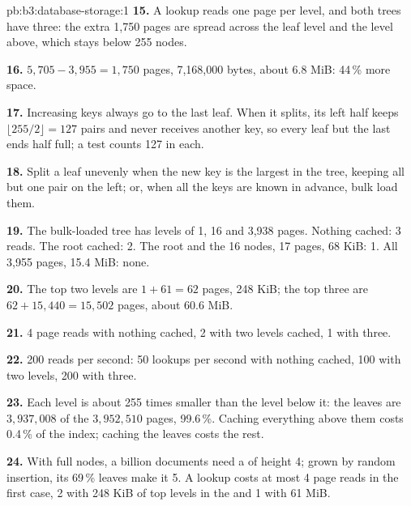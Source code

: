 \begin{solution}{pb:b3:database-storage:1}
\textbf{15.} A lookup reads one page per level, and both trees have three: the extra 1,750 pages are spread across the leaf level and the level above, which stays below 255 nodes.

\textbf{16.} $5{,}705 - 3{,}955 = 1{,}750$ pages, 7,168,000 bytes, about 6.8 MiB: 44\,\% more space.

\textbf{17.} Increasing keys always go to the last leaf. When it splits, its left half keeps $\lfloor 255/2 \rfloor = 127$ pairs and never receives another key, so every leaf but the last ends half full; a test counts 127 in each.

\textbf{18.} Split a leaf unevenly when the new key is the largest in the tree, keeping all but one pair on the left; or, when all the keys are known in advance, bulk load them.

\textbf{19.} The bulk-loaded tree has levels of 1, 16 and 3,938 pages. Nothing cached: 3 reads. The root cached: 2. The root and the 16 nodes, 17 pages, 68 KiB: 1. All 3,955 pages, 15.4 MiB: none.

\textbf{20.} The top two levels are $1 + 61 = 62$ pages, 248 KiB; the top three are $62 + 15{,}440 = 15{,}502$ pages, about 60.6 MiB.

\textbf{21.} 4 page reads with nothing cached, 2 with two levels cached, 1 with three.

\textbf{22.} 200 reads per second: 50 lookups per second with nothing cached, 100 with two levels, 200 with three.

\textbf{23.} Each level is about 255 times smaller than the level below it: the leaves are $3{,}937{,}008$ of the $3{,}952{,}510$ pages, 99.6\,\%. Caching everything above them costs 0.4\,\% of the index; caching the leaves costs the rest.

\textbf{24.} With full nodes, a billion documents need a  of height 4; grown by random insertion, its 69\,\% leaves make it 5. A lookup costs at most 4 page reads in the first case, 2 with 248 KiB of top levels in the  and 1 with 61 MiB.
\end{solution}
